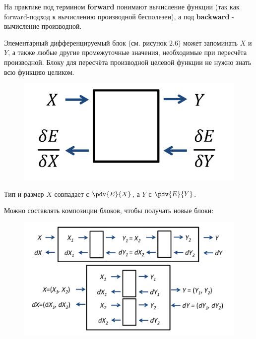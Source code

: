 \begin{remark}
    На практике под термином \textbf{forward} понимают вычисление функции (так как forward-подход к вычислению производной бесполезен), а под \textbf{backward} - вычисление производной.
\end{remark}

Элементарный дифференцируемый блок (см. рисунок 2.6) может запоминать $X$ и $Y$, а также любые другие промежуточные значения, необходимые при пересчёта производной. Блоку для пересчёта производной целевой функции не нужно знать всю функцию целиком.

\begin{figure}[h]
    \centering
    \includegraphics[scale=0.3]{./images/elementary-differential-block.png}
\end{figure}

\begin{remark}
    Тип и размер $X$ совпадает с $\pdv{E}{X}$, а $Y$ с $\pdv{E}{Y}$.
\end{remark}

Можно составлять композиции блоков, чтобы получать новые блоки:
\begin{figure}[h]
    \centering
    \includegraphics[scale=0.5]{./images/blocks-composition.png}
\end{figure}

